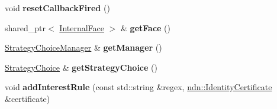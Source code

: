 \begin{DoxyCompactItemize}
\item 
void {\bfseries reset\+Callback\+Fired} ()\hypertarget{classnfd_1_1tests_1_1StrategyChoiceManagerFixture_aa3b6dcfe6e7636cfa1e2679b43dd4398}{}\label{classnfd_1_1tests_1_1StrategyChoiceManagerFixture_aa3b6dcfe6e7636cfa1e2679b43dd4398}

\item 
shared\+\_\+ptr$<$ \hyperlink{classnfd_1_1InternalFace}{Internal\+Face} $>$ \& {\bfseries get\+Face} ()\hypertarget{classnfd_1_1tests_1_1StrategyChoiceManagerFixture_acaa85035ea6f2585de4ece04b132ee87}{}\label{classnfd_1_1tests_1_1StrategyChoiceManagerFixture_acaa85035ea6f2585de4ece04b132ee87}

\item 
\hyperlink{classnfd_1_1StrategyChoiceManager}{Strategy\+Choice\+Manager} \& {\bfseries get\+Manager} ()\hypertarget{classnfd_1_1tests_1_1StrategyChoiceManagerFixture_a784ffd5cbd647245e6d7ea05b27128a6}{}\label{classnfd_1_1tests_1_1StrategyChoiceManagerFixture_a784ffd5cbd647245e6d7ea05b27128a6}

\item 
\hyperlink{classnfd_1_1StrategyChoice}{Strategy\+Choice} \& {\bfseries get\+Strategy\+Choice} ()\hypertarget{classnfd_1_1tests_1_1StrategyChoiceManagerFixture_a821fb5032936eb4904e3add634702f13}{}\label{classnfd_1_1tests_1_1StrategyChoiceManagerFixture_a821fb5032936eb4904e3add634702f13}

\item 
void {\bfseries add\+Interest\+Rule} (const std\+::string \&regex, \hyperlink{classndn_1_1IdentityCertificate}{ndn\+::\+Identity\+Certificate} \&certificate)\hypertarget{classnfd_1_1tests_1_1StrategyChoiceManagerFixture_a837d6d027ab9130e876704d718ea879f}{}\label{classnfd_1_1tests_1_1StrategyChoiceManagerFixture_a837d6d027ab9130e876704d718ea879f}

\end{DoxyCompactItemize}
